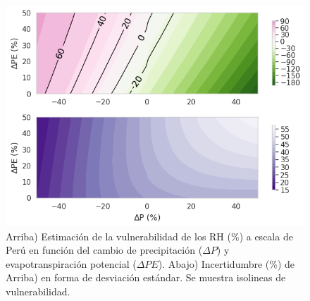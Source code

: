 \begin{figure}[htb]
	\includegraphics[scale=.8]{Images/12_VI_PERU_scale.png}
	\centering
	\caption{Arriba) Estimación de la vulnerabilidad de los RH (\%) a escala de Perú en función del cambio de precipitación ($\Delta P$) y evapotranspiración potencial ($\Delta PE$). Abajo) Incertidumbre (\%) de Arriba) en forma de desviación estándar. Se muestra isolineas de vulnerabilidad.}
	\label{fig:12_VI_PERU_scale}
\end{figure}
